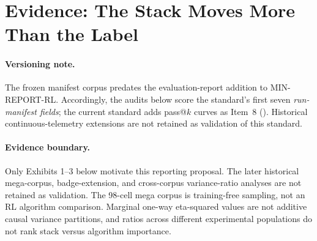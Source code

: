 \section{Evidence: The Stack Moves More Than the Label}
\label{sec:p5-evidence}

\paragraph{Versioning note.}
The frozen manifest corpus predates the evaluation-report addition to
MIN-REPORT-RL.  Accordingly, the audits below score the standard's first seven
\emph{run-manifest fields}; the current standard adds pass@$k$ curves as
Item~8 (). Historical continuous-telemetry extensions
are not retained as validation of this standard.

\paragraph{Evidence boundary.}
Only Exhibits 1--3 below motivate this reporting proposal. The later historical
mega-corpus, badge-extension, and cross-corpus variance-ratio analyses are not
retained as validation. The 98-cell mega corpus is training-free sampling,
not an RL algorithm comparison. Marginal one-way eta-squared values are not
additive causal variance partitions, and ratios across different experimental
populations do not rank stack versus algorithm importance.


